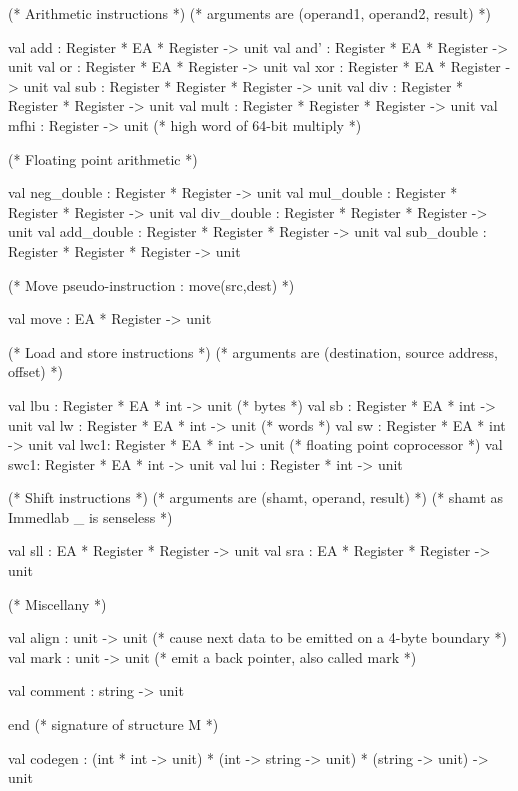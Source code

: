     (* Arithmetic instructions *)
            (* arguments are (operand1, operand2, result) *)

    val add : Register * EA * Register -> unit
    val and' : Register * EA * Register -> unit
    val or : Register * EA * Register -> unit
    val xor : Register * EA * Register -> unit
    val sub : Register * Register * Register -> unit
    val div : Register * Register * Register -> unit
    val mult : Register * Register * Register -> unit
    val mfhi : Register -> unit         (* high word of 64-bit multiply *)
    
    (* Floating point arithmetic *)

    val neg_double : Register * Register -> unit
    val mul_double : Register * Register * Register -> unit
    val div_double : Register * Register * Register -> unit
    val add_double : Register * Register * Register -> unit
    val sub_double : Register * Register * Register -> unit

    (* Move pseudo-instruction :  move(src,dest) *)

    val move : EA * Register -> unit

    (* Load and store instructions *)
            (* arguments are (destination, source address, offset) *)
 
    val lbu  : Register * EA * int -> unit (* bytes *)
    val sb  : Register * EA * int -> unit
    val lw  : Register * EA * int -> unit  (* words *)
    val sw  : Register * EA * int -> unit
    val lwc1: Register * EA * int -> unit  (* floating point coprocessor *)
    val swc1: Register * EA * int -> unit
    val lui : Register * int -> unit

    (* Shift instructions *)
            (* arguments are (shamt, operand, result) *)
            (* shamt as Immedlab _ is senseless *)

    val sll : EA * Register * Register -> unit
    val sra : EA * Register * Register -> unit
    

    (* Miscellany *)

    val align : unit -> unit            (* cause next data to be emitted on
                                           a 4-byte boundary *)
    val mark : unit -> unit             (* emit a back pointer, 
                                           also called mark *)

    val comment : string -> unit

  end (* signature of structure M *)

  val codegen : (int * int -> unit) * (int -> string -> unit) 
                        * (string -> unit) -> unit

